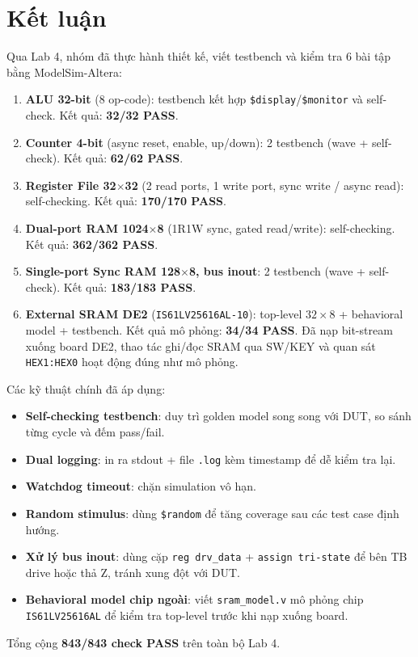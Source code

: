 \documentclass[12pt,a4paper]{article}
\begin{document}
\newpage

\section{Kết luận}

Qua Lab 4, nhóm đã thực hành thiết kế, viết testbench và kiểm tra 6 bài tập bằng ModelSim-Altera:

\begin{enumerate}
    \item \textbf{ALU 32-bit} (8 op-code): testbench kết hợp \texttt{\$display}/\texttt{\$monitor} và self-check. Kết quả: \textbf{32/32 PASS}.
    \item \textbf{Counter 4-bit} (async reset, enable, up/down): 2 testbench (wave + self-check). Kết quả: \textbf{62/62 PASS}.
    \item \textbf{Register File 32$\times$32} (2 read ports, 1 write port, sync write / async read): self-checking. Kết quả: \textbf{170/170 PASS}.
    \item \textbf{Dual-port RAM 1024$\times$8} (1R1W sync, gated read/write): self-checking. Kết quả: \textbf{362/362 PASS}.
    \item \textbf{Single-port Sync RAM 128$\times$8, bus inout}: 2 testbench (wave + self-check). Kết quả: \textbf{183/183 PASS}.
    \item \textbf{External SRAM DE2} (\texttt{IS61LV25616AL-10}): top-level $32 \times 8$ + behavioral model + testbench. Kết quả mô phỏng: \textbf{34/34 PASS}. Đã nạp bit-stream xuống board DE2, thao tác ghi/đọc SRAM qua SW/KEY và quan sát \texttt{HEX1:HEX0} hoạt động đúng như mô phỏng.
\end{enumerate}

Các kỹ thuật chính đã áp dụng:
\begin{itemize}
    \item \textbf{Self-checking testbench}: duy trì golden model song song với DUT, so sánh từng cycle và đếm pass/fail.
    \item \textbf{Dual logging}: in ra stdout + file \texttt{.log} kèm timestamp để dễ kiểm tra lại.
    \item \textbf{Watchdog timeout}: chặn simulation vô hạn.
    \item \textbf{Random stimulus}: dùng \texttt{\$random} để tăng coverage sau các test case định hướng.
    \item \textbf{Xử lý bus inout}: dùng cặp \texttt{reg drv\_data} + \texttt{assign tri-state} để bên TB drive hoặc thả Z, tránh xung đột với DUT.
    \item \textbf{Behavioral model chip ngoài}: viết \texttt{sram\_model.v} mô phỏng chip \texttt{IS61LV25616AL} để kiểm tra top-level trước khi nạp xuống board.
\end{itemize}

Tổng cộng \textbf{843/843 check PASS} trên toàn bộ Lab 4.
\end{document}
